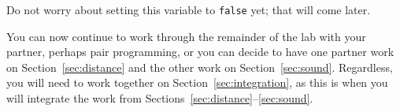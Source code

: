 Do not worry about setting this variable to \lstinline{false} yet;
that will come later.

\vspace{1cm}

You can now continue to work through the remainder of the lab with your partner, perhaps pair programming,
or you can decide to have one partner work on Section~\ref{sec:distance} and the other work on Section~\ref{sec:sound}.
Regardless, you will need to work together on Section~\ref{sec:integration}, as this is when you will integrate the work from Sections~\ref{sec:distance}--\ref{sec:sound}.
